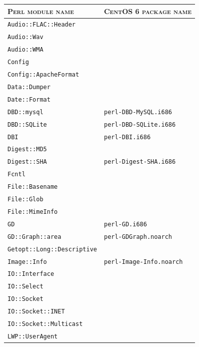 \documentclass[a4paper,oneside,10pt]{report}
\begin{document}
\begin{table}
	\centering
	\begin{tabular}{|p{15em}|p{18em}|}
		\hline
		\textsc{Perl module name} 						&  \textsc{CentOS 6 package name}\\
		\hline
		\hline
		\verb|Audio::FLAC::Header| 						& \\
		\hline
		\verb|Audio::Wav| 										& \\
		\hline
		\verb|Audio::WMA| 										& \\
		\hline
		\verb|Config| 												& \\
		\hline
		\verb|Config::ApacheFormat|						& \\
		\hline
		\verb|Data::Dumper| 									& \\
		\hline
		\verb|Date::Format| 									&	\\
		\hline
		\verb|DBD::mysql|											& \verb|perl-DBD-MySQL.i686| \\
		\hline
		\verb|DBD::SQLite|										& \verb|perl-DBD-SQLite.i686| \\
		\hline
		\verb|DBI|														& \verb|perl-DBI.i686| \\
		\hline
		\verb|Digest::MD5| 										& \\
		\hline
		\verb|Digest::SHA| 										& \verb|perl-Digest-SHA.i686| \\
		\hline
		\verb|Fcntl| 													& \\
		\hline
		\verb|File::Basename| 								& \\
		\hline
		\verb|File::Glob| 										& \\
		\hline
		\verb|File::MimeInfo| 								& \\
		\hline
		\verb|GD| 														& \verb|perl-GD.i686|\\
		\hline
		\verb|GD::Graph::area| 								& \verb|perl-GDGraph.noarch| \\
		\hline
		\verb|Getopt::Long::Descriptive| 			& \\
		\hline
		\verb|Image::Info| 										& \verb|perl-Image-Info.noarch| \\
		\hline
		\verb|IO::Interface| 									& \\
		\hline
		\verb|IO::Select| 										& \\
		\hline
		\verb|IO::Socket| 										& \\
		\hline
		\verb|IO::Socket::INET| 							& \\
		\hline
		\verb|IO::Socket::Multicast| 					& \\
		\hline
		\verb|LWP::UserAgent| 								& \\

\end{tabular}
\end{table}
\end{document}
